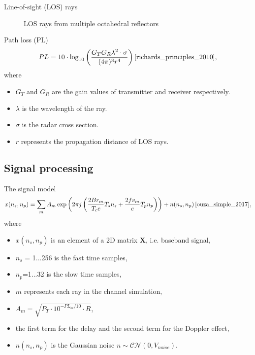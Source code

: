\documentclass{beamer}
\newcounter{section}
\begin{document}
\begin{frame}[t]{Line-of-sight (LOS) rays}
\begin{itemize}
\begin{figure}
\begin{minipage}{0.45\textwidth}
                    \caption{LOS rays from multiple octahedral reflectors}
                \end{minipage}
            \end{figure}
	\end{itemize}
\end{frame}



\begin{frame}[t]{Path loss (PL)}
    \begin{equation}
        \centering
        PL = 10\cdot\log_{10}\left(\frac{G_{T}G_{R}\lambda^{2}\cdot\sigma}{(4\pi)^{3} r^{4}}\right) \cite{richards_principles_2010},
        \label{path loss formula}
    \end{equation}
    where
    \begin{itemize}
        \item $G_T$ and $G_R$ are the gain values of transmitter and receiver respectively.
        \item $\lambda$ is the wavelength of the ray.
        \item $\sigma$ is the radar cross section.
        \item $r$ represents the propagation distance of LOS rays.
    \end{itemize}
\end{frame}




\subsection{Signal processing}
\begin{frame}[t]{The signal model}
    \begin{equation}
        \centering
        x(n_s, n_p) = \sum_{m} A_m \exp \left( 2\pi j \left(\frac{2 B r_{m}}{T_c c} T_s n_s + \frac{2 f v_{m}}{c} T_p n_p \right) \right) + n(n_s, n_p)\,\mathrm{\cite{ouza_simple_2017}},
    \end{equation}
    where
    \begin{itemize}
        \item $x(n_s, n_p)$ is an element of a 2D matrix $\mathbf{X}$, i.e. baseband signal,
        \item $n_s$ = 1...256 is the fast time samples,
        \item $n_p$=1...32 is the slow time samples,
        \item $m$ represents each ray in the channel simulation,
        \item $A_m = \sqrt{P_T \cdot 10^{-PL_m / 10} \cdot R}$,
        \item the first term for the delay and the second term for the Doppler effect,
        \item $n(n_s, n_p)$ is the Gaussian noise $n \sim \mathcal{CN}(0, V_{noise})$.
    \end{itemize}
\end{frame}
\end{document}
